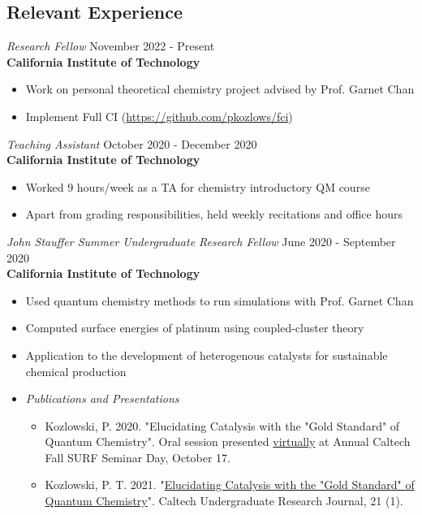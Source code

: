 \documentclass[margin,line]{resume}
\begin{document}
\begin{resume}
\section{\mysidestyle Relevant Experience}
{\sl Research Fellow} \hfill November 2022 - Present\\
\textbf{California Institute of Technology}
\begin{itemize}
\item Work on personal theoretical chemistry project advised by Prof. Garnet Chan
\item Implement Full CI (\url{https://github.com/pkozlows/fci})
\end{itemize}
{\sl Teaching Assistant} \hfill October 2020 - December 2020\\
\textbf{California Institute of Technology}
\begin{itemize}
\item Worked 9 hours/week as a TA for chemistry introductory QM course
\item Apart from grading responsibilities, held weekly recitations and office hours
\end{itemize}
{\sl John Stauffer Summer Undergraduate Research Fellow} \hfill June 2020 - September 2020 \\
\textbf{California Institute of Technology}
\begin{itemize}
\item Used quantum chemistry methods to run simulations with Prof. Garnet Chan
\item Computed surface energies of platinum using coupled-cluster theory
\item Application to the development of heterogenous catalysts for sustainable chemical production
\item \emph{Publications and Presentations}
    \begin{itemize}
        \item Kozlowski, P. 2020. "Elucidating Catalysis with the "Gold Standard" of Quantum Chemistry". Oral session presented \href{https://youtu.be/pcNnGM0bYRw}{virtually} at Annual Caltech Fall SURF Seminar Day, October 17.
        \item Kozlowski, P. T. 2021. "\href{https://curj.caltech.edu/2021/06/29/elucidating-catalysis-with-the-gold-standard-of-quantum-chemistry/}{Elucidating Catalysis with the "Gold Standard" of Quantum Chemistry}". Caltech Undergraduate Research Journal, 21 (1).
    \end{itemize}
\end{itemize} 

\end{resume}
\end{document}
